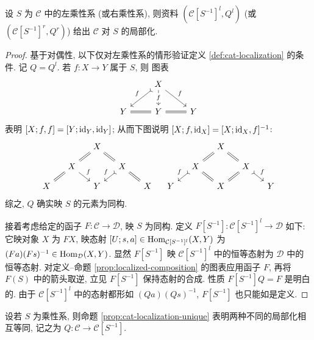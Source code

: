 \begin{theorem}\label{prop:Gabriel-Zisman}
	设 $S$ 为 $\mathcal{C}$ 中的左乘性系 (或右乘性系), 则资料 $\left( \mathcal{C}[S^{-1}]^l, Q^l \right)$ (或 $\left( \mathcal{C}[S^{-1}]^r, Q^r \right)$) 给出 $\mathcal{C}$ 对 $S$ 的局部化.
\end{theorem}
\begin{proof}
	基于对偶性, 以下仅对左乘性系的情形验证定义 \ref{def:cat-localization} 的条件. 记 $Q = Q^l$. 若 $f: X \to Y$ 属于 $S$, 则
	图表
	\[ \begin{tikzcd}
		& X \arrow[rightarrowtail, ld, "f"'] \arrow[rd, "f"] \arrow[d, "f" description] & \\
		Y & Y \arrow[equal, l] \arrow[equal, r] & Y
	\end{tikzcd}\]
	表明 $[X; f, f] = [Y; \mathrm{id}_Y, \mathrm{id}_Y]$; 从而下图说明 $[X; f, \mathrm{id}_X] = [X; \mathrm{id}_X, f]^{-1}$:
	\[\begin{tikzcd}[column sep=small, row sep=small]
		& & X \arrow[equal, ld] \arrow[equal, rd] & & \\
		& X \arrow[equal, ld] \arrow[rd, "f"] & & X \arrow[rightarrowtail, ld, "f"'] \arrow[equal, rd] & \\
		X & & Y & & X
	\end{tikzcd} \quad \begin{tikzcd}[column sep=small, row sep=small]
		& & X \arrow[equal, ld] \arrow[equal, rd] & & \\
		& X \arrow[rightarrowtail, ld, "f"'] \arrow[equal, rd] & & X \arrow[equal, ld] \arrow[rightarrowtail, rd, "f"] & \\
		Y & & X & & Y
	\end{tikzcd}\]
	综之, $Q$ 确实映 $S$ 的元素为同构.

	接着考虑给定的函子 $F: \mathcal{C} \to \mathcal{D}$, 映 $S$ 为同构. 定义 $F[S^{-1}]: \mathcal{C}[S^{-1}]^l \to \mathcal{D}$ 如下: 它映对象 $X$ 为 $FX$, 映态射 $[U; s, a] \in \operatorname{Hom}_{\mathcal{C}[S^{-1}]^l}(X, Y)$ 为 $(Fa)(Fs)^{-1} \in \operatorname{Hom}_{\mathcal{D}}(X, Y)$. 显然 $F[S^{-1}]$ 映 $\mathcal{C}[S^{-1}]^l$ 中的恒等态射为 $\mathcal{D}$ 中的恒等态射. 对定义--命题 \ref{prop:localized-composition} 的图表应用函子 $F$, 再将 $F(S)$ 中的箭头取逆, 立见 $F[S^{-1}]$ 保持态射的合成. 性质 $F[S^{-1}] Q = F$ 是明白的. 由于 $\mathcal{C}[S^{-1}]^l$ 中的态射都形如 $(Qa)(Qs)^{-1}$, $F[S^{-1}]$ 也只能如是定义.
\end{proof}

\begin{convention}
	设若 $S$ 为乘性系, 则命题 \ref{prop:cat-localization-unique} 表明两种不同的局部化相互等同, 记之为 $Q: \mathcal{C} \to \mathcal{C}[S^{-1}]$.
\end{convention}

